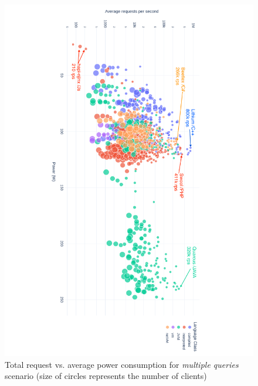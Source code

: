 \begin{table}[!h]
    \raggedright
    \caption{Average power consumption of frameworks based on the database type}
    \label{table:query_db_row}
\end{table}


\begin{figure}[!h]
    \includegraphics[height=\textwidth,width=\textheight,keepaspectratio,angle=90]{imgs/power_requests_query_log}
    \caption{Total request vs. average power consumption for \emph{multiple queries} scenario (size of circles represents the number of clients)}
    \label{fig:power_requests_query}
\end{figure}

